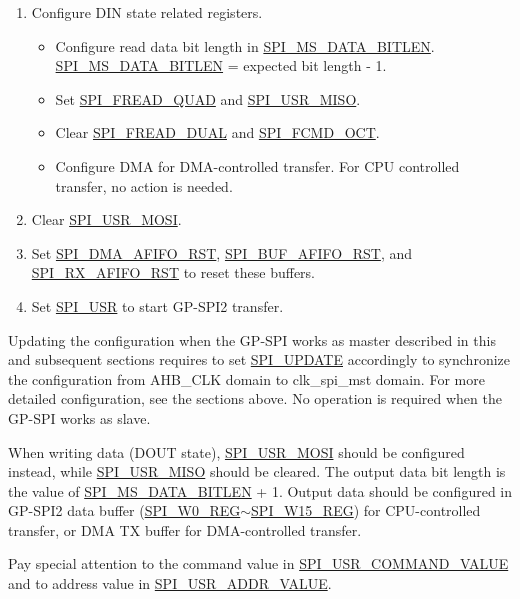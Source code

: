 \documentclass[main\_\_EN.tex]{subfiles}
\begin{document}
\begin{enumerate}
    \item Configure DIN state related registers.
        \begin{itemize}
            \item Configure read data bit length in \hyperref[fielddesc:SPIMSDATABITLEN]{SPI\_MS\_DATA\_BITLEN}. \hyperref[fielddesc:SPIMSDATABITLEN]{SPI\_MS\_DATA\_BITLEN} = expected bit length - 1.
            \item Set \hyperref[fielddesc:SPIFREADQUAD]{SPI\_FREAD\_QUAD} and \hyperref[fielddesc:SPIUSRMISO]{SPI\_USR\_MISO}.
            \item Clear \hyperref[fielddesc:SPIFREADDUAL]{SPI\_FREAD\_DUAL} and \hyperref[fielddesc:SPIFCMDOCT]{SPI\_FCMD\_OCT}.
            \item Configure DMA for DMA-controlled transfer. For CPU controlled transfer, no action is needed.
        \end{itemize}
    \item Clear \hyperref[fielddesc:SPIUSRMOSI]{SPI\_USR\_MOSI}.
    \item Set \hyperref[fielddesc:SPIDMAAFIFORST]{SPI\_DMA\_AFIFO\_RST}, \hyperref[fielddesc:SPIBUFAFIFORST]{SPI\_BUF\_AFIFO\_RST}, and \hyperref[fielddesc:SPIRXAFIFORST]{SPI\_RX\_AFIFO\_RST} to reset these buffers.
    \item Set \hyperref[fielddesc:SPIUSR]{SPI\_USR} to start GP-SPI2 transfer.
\end{enumerate}

\begin{tiplisting}
Updating the configuration when the GP-SPI works as master described in this and subsequent sections requires to set \hyperref[fielddesc:SPIUPDATE]{SPI\_UPDATE} accordingly to
synchronize the configuration from AHB\_CLK domain to clk\_spi\_mst domain. For more detailed configuration, see the sections above. No operation is required when the GP-SPI works as slave.
\end{tiplisting}

When writing data (DOUT state), \hyperref[fielddesc:SPIUSRMOSI]{SPI\_USR\_MOSI} should be configured instead, while \hyperref[fielddesc:SPIUSRMISO]{SPI\_USR\_MISO} should be cleared. The output data bit length is the value of \hyperref[fielddesc:SPIMSDATABITLEN]{SPI\_MS\_DATA\_BITLEN} + 1. Output data should be configured in GP-SPI2 data buffer (\hyperref[regdesc:SPIW0REG]{SPI\_W0\_REG}$\sim$\hyperref[regdesc:SPIW15REG]{SPI\_W15\_REG}) for CPU-controlled transfer, or DMA TX buffer for DMA-controlled transfer.

Pay special attention to the command value in \hyperref[fielddesc:SPIUSRCOMMANDVALUE]{SPI\_USR\_COMMAND\_VALUE} and to address value in \hyperref[fielddesc:SPIUSRADDRVALUE]{SPI\_USR\_ADDR\_VALUE}.
\end{document}
